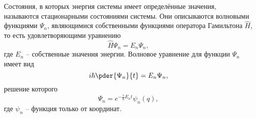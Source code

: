 Состояния, в которых энергия системы имеет определённые значения, называются
стационарными состояниями системы. Они описываются волновыми функциями
\( \Psi_n \), являющимися собственными функциями оператора Гамильтона
\( \hat{H} \), то есть удовлетворяющими уравнению
\[
    \hat{H}\Psi_n = E_n\Psi_n,
\]
где \( E_n \) -- собственные значения энергии. Волновое уравнение для функции
\( \Psi_n \) имеет вид
\[
    i\hbar\pder{\Psi_n}{t} = E_n\Psi_n,
\]
решение которого
\[
    \Psi_n = e^{-\frac{i}{\hbar}E_nt}\psi_n(q),
\]
где \( \psi_n \) -- функция только от координат.


